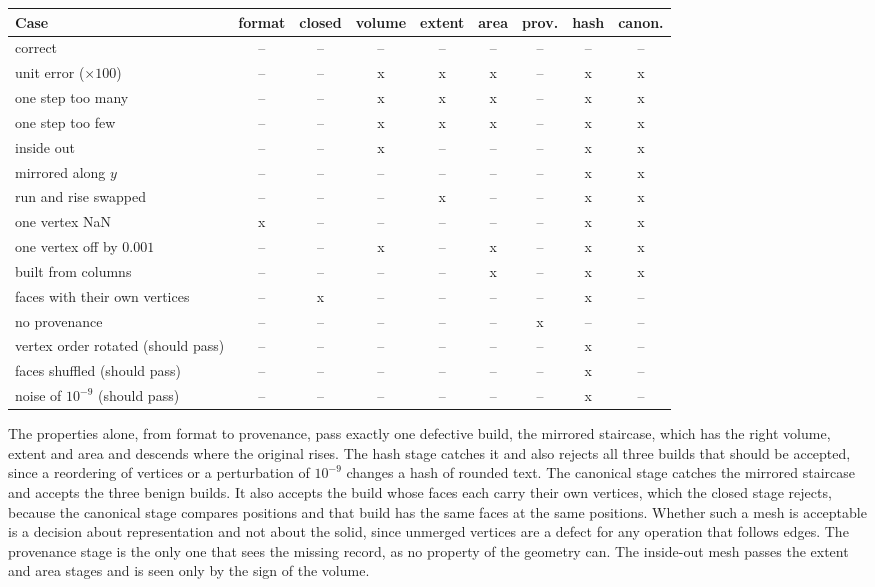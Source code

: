 \begin{center}
\footnotesize
\setlength{\tabcolsep}{3pt}
\begin{tabular}{lcccccccc}
\toprule
Case & format & closed & volume & extent & area & prov. & hash & canon.\\
\midrule
correct & -- & -- & -- & -- & -- & -- & -- & --\\
unit error ($\times 100$) & -- & -- & x & x & x & -- & x & x\\
one step too many & -- & -- & x & x & x & -- & x & x\\
one step too few & -- & -- & x & x & x & -- & x & x\\
inside out & -- & -- & x & -- & -- & -- & x & x\\
mirrored along $y$ & -- & -- & -- & -- & -- & -- & x & x\\
run and rise swapped & -- & -- & -- & x & -- & -- & x & x\\
one vertex NaN & x & -- & -- & -- & -- & -- & x & x\\
one vertex off by $0.001$ & -- & -- & x & -- & x & -- & x & x\\
built from columns & -- & -- & -- & -- & x & -- & x & x\\
faces with their own vertices & -- & x & -- & -- & -- & -- & x & --\\
no provenance & -- & -- & -- & -- & -- & x & -- & --\\
\midrule
vertex order rotated (should pass) & -- & -- & -- & -- & -- & -- & x & --\\
faces shuffled (should pass) & -- & -- & -- & -- & -- & -- & x & --\\
noise of $10^{-9}$ (should pass) & -- & -- & -- & -- & -- & -- & x & --\\
\bottomrule
\end{tabular}
\end{center}

The properties alone, from format to provenance, pass exactly one defective build, the mirrored staircase, which has the right volume, extent and area and descends where the original rises. The hash stage catches it and also rejects all three builds that should be accepted, since a reordering of vertices or a perturbation of $10^{-9}$ changes a hash of rounded text. The canonical stage catches the mirrored staircase and accepts the three benign builds. It also accepts the build whose faces each carry their own vertices, which the closed stage rejects, because the canonical stage compares positions and that build has the same faces at the same positions. Whether such a mesh is acceptable is a decision about representation and not about the solid, since unmerged vertices are a defect for any operation that follows edges. The provenance stage is the only one that sees the missing record, as no property of the geometry can. The inside-out mesh passes the extent and area stages and is seen only by the sign of the volume.


